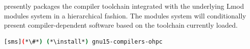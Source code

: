 \OHPC{} presently packages the \GNU{} compiler toolchain integrated with the 
underlying Lmod modules system in a hierarchical fashion. The modules
system will conditionally present compiler-dependent software based on the
toolchain currently loaded. 

\begin{lstlisting}[language=bash]
[sms](*\#*) (*\install*) gnu15-compilers-ohpc
\end{lstlisting}

